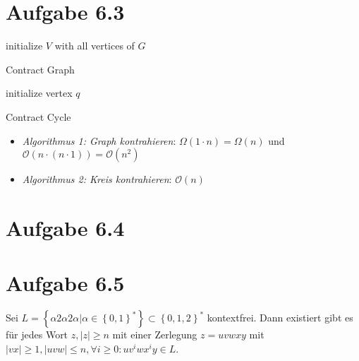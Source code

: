 \documentclass{article}
\begin{document}
\section*{Aufgabe 6.3}
\begin{algorithm}[H]
  initialize $V$ with all vertices of $G$\;
  \caption{Contract Graph}
\end{algorithm}

\begin{algorithm}[H]
  initialize vertex $q$\;
  \caption{Contract Cycle}
\end{algorithm}

\begin{itemize}
	\item \textit{Algorithmus 1: Graph kontrahieren}: $\Omega(1 \cdot n) = \Omega(n)$ und $\mathcal{O}(n \cdot (n \cdot 1)) = \mathcal{O}(n^2)$
  \item \textit{Algorithmus 2: Kreis kontrahieren}: $\mathcal{O}(n)$
\end{itemize}



\section*{Aufgabe 6.4}



\section*{Aufgabe 6.5}
Sei $L = \left\{\alpha 2 \alpha 2 \alpha | \alpha \in \left\{0,1\right\}^* \right\} \subset \left\{0,1,2\right\}^*$ kontextfrei. Dann existiert gibt es für jedes Wort $z, |z|\geq n$ mit einer Zerlegung $z=uvwxy$ mit $|vx|\geq 1, |uvw|\leq n, \forall i \geq 0: uv^iwx^iy \in L$.
\end{document}
